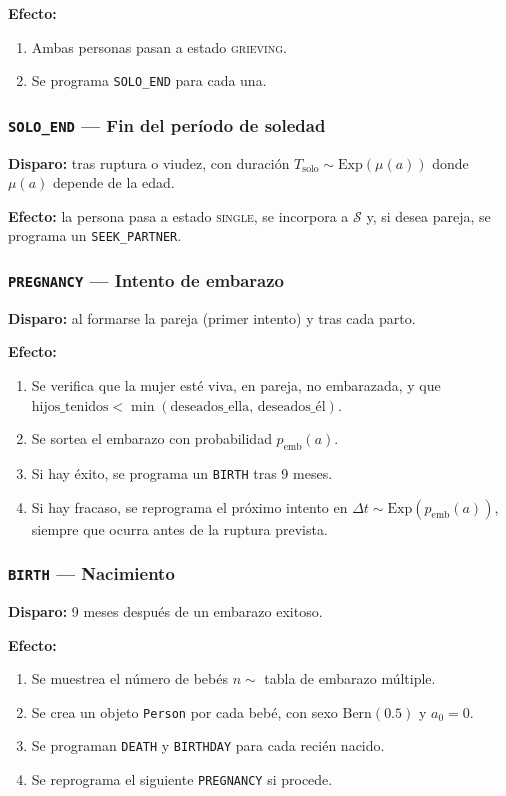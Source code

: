 \documentclass[12pt, a4paper]{article}
\newcommand{\Exp}[1]{\mathrm{Exp}\!\left(#1\right)}
\newcommand{\Bern}[1]{\mathrm{Bern}\!\left(#1\right)}
\newcommand{\code}[1]{\texttt{#1}}
\begin{document}
\textbf{Efecto:}
\begin{enumerate}
  \item Ambas personas pasan a estado \textsc{grieving}.
  \item Se programa \code{SOLO\_END} para cada una.
\end{enumerate}

\subsubsection*{\code{SOLO\_END} — Fin del período de soledad}

\textbf{Disparo:} tras ruptura o viudez, con duración
$T_\mathrm{solo} \sim \Exp{\mu(a)}$ donde $\mu(a)$ depende de la edad.

\textbf{Efecto:} la persona pasa a estado \textsc{single},
se incorpora a $\mathcal{S}$ y, si desea pareja,
se programa un \code{SEEK\_PARTNER}.

\subsubsection*{\code{PREGNANCY} — Intento de embarazo}

\textbf{Disparo:} al formarse la pareja (primer intento) y tras cada parto.

\textbf{Efecto:}
\begin{enumerate}
  \item Se verifica que la mujer esté viva, en pareja, no embarazada, y que
        $\text{hijos\_tenidos} < \min(\text{deseados\_ella},\,\text{deseados\_él})$.
  \item Se sortea el embarazo con probabilidad $p_\mathrm{emb}(a)$.
  \item Si hay éxito, se programa un \code{BIRTH} tras 9 meses.
  \item Si hay fracaso, se reprograma el próximo intento en
        $\Delta t \sim \Exp{p_\mathrm{emb}(a)}$, siempre que ocurra
        antes de la ruptura prevista.
\end{enumerate}

\subsubsection*{\code{BIRTH} — Nacimiento}

\textbf{Disparo:} 9 meses después de un embarazo exitoso.

\textbf{Efecto:}
\begin{enumerate}
  \item Se muestrea el número de bebés $n \sim$ tabla de embarazo múltiple.
  \item Se crea un objeto \code{Person} por cada bebé, con sexo
        $\Bern{0.5}$ y $a_0 = 0$.
  \item Se programan \code{DEATH} y \code{BIRTHDAY} para cada recién nacido.
  \item Se reprograma el siguiente \code{PREGNANCY} si procede.
\end{enumerate}
\end{document}
